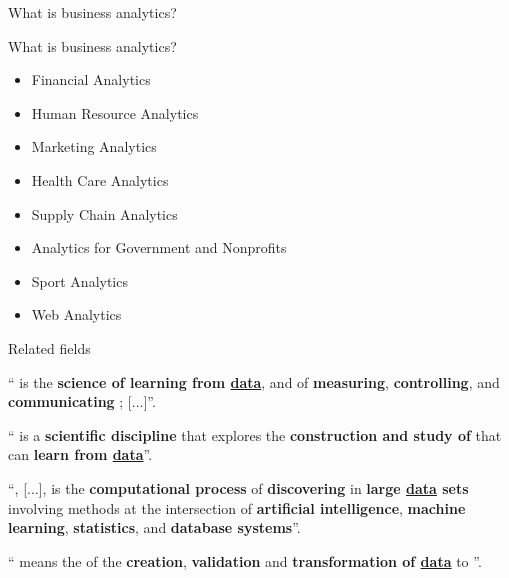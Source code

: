 \documentclass[14pt]{beamer}
\begin{document}
\begin{frame}{What is business analytics?}


\end{frame}

\begin{frame}{What is business analytics?}

{\small
\begin{itemize}
	\item Financial Analytics
	\item Human Resource Analytics	
	\item Marketing Analytics
	\item Health Care Analytics
	\item Supply Chain Analytics
	\item Analytics for Government and Nonprofits
	\item Sport Analytics
	\item Web Analytics
\end{itemize}
}

\end{frame}



\begin{frame}{Related fields}\fontsize{12}{12}\sf
\begin{block}{}
`` is the \textbf{science of learning from \underline{data}}, and of \textbf{measuring}, \textbf{controlling}, and \textbf{communicating }; [...]''.
\end{block}\pause

\begin{block}{}
`` is a \textbf{scientific discipline} that explores the \textbf{construction and study of } that can \textbf{learn from \underline{data}}''.
\end{block}\pause

\begin{block}{}
``, [...], is the \textbf{computational process} of \textbf{discovering } in \textbf{large \underline{data} sets} involving methods at the intersection of \textbf{artificial intelligence}, \textbf{machine learning}, \textbf{statistics}, and \textbf{database systems}''.
\end{block}\pause

\begin{block}{}
`` means the \textbf{} of the \textbf{creation}, \textbf{validation} and \textbf{transformation of \underline{data}} to \textbf{}''.
\end{block}

\end{frame}
\end{document}
